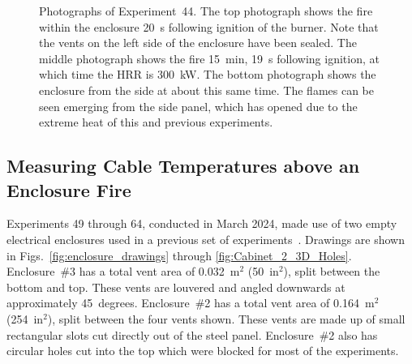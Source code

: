 \begin{figure}[p]
\caption[Photographs of Experiment~44]{Photographs of Experiment~44. The top photograph shows the fire within the enclosure 20~s following ignition of the burner. Note that the vents on the left side of the enclosure have been sealed. The middle photograph shows the fire 15~min, 19~s following ignition, at which time the HRR is 300~kW. The bottom photograph shows the enclosure from the side at about this same time. The flames can be seen emerging from the side panel, which has opened due to the extreme heat of this and previous experiments.}
\label{fig:Test_44_photos}
\end{figure}


\clearpage


\subsection{Measuring Cable Temperatures above an Enclosure Fire}

Experiments 49 through 64, conducted in March 2024, made use of two empty electrical enclosures used in a previous set of experiments~\cite{OLIVE-FIRE}. Drawings are shown in Figs.~\ref{fig:enclosure_drawings} through \ref{fig:Cabinet_2_3D_Holes}. Enclosure~\#3 has a total vent area of 0.032~m$^2$ (50~in$^2$), split between the bottom and top. These vents are louvered and angled downwards at approximately 45~degrees. Enclosure~\#2 has a total vent area of 0.164~m$^2$ (254~in$^2$), split between the four vents shown. These vents are made up of small rectangular slots cut directly out of the steel panel. Enclosure~\#2 also has circular holes cut into the top which were blocked for most of the experiments.

